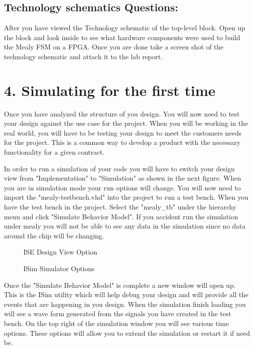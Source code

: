 \documentclass{article}
\begin{document}
\subsection{Technology schematics Questions:}
After you have viewed the Technology schematic of the top-level block. Open up the block and look inside to see what hardware components were used to build the Mealy FSM on a FPGA. Once you are done take a screen shot of the technology schematic and attach it to the lab report.

\section{4. Simulating for the first time}
Once you have analyzed the structure of you design. You will now need to test your design against the use case for the project. When you will be working in the real world, you will have to be testing your design to meet the customers needs for the project. This is a common way to develop a product with the necessary functionality for a given contract.

In order to run a simulation of your code you will have to switch your design view from "Implementation" to "Simulation" as shown in the next figure. When you are in simulation mode your run options will change. You will now need to import the "mealy-testbench.vhd" into the project to run a test bench. When you have the test bench in the project. Select the "mealy\_tb" under the hierarchy menu and click "Simulate Behavior Model". If you accident run the simulation under mealy you will not be able to see any data in the simulation since no data around the chip will be changing.

\begin{figure}[!htb]
  \centering
  \caption{ISE Design View Option}
\end{figure}

\begin{figure}[!htb]
  \centering
  \caption{ISim Simulator Options}
\end{figure}

Once the "Simulate Behavior Model" is complete a new window will open up. This is the ISim utility which will help debug your design and will provide all the events that are happening in you design. When the simulation finish loading you will see a wave form generated from the signals you have created in the test bench. On the top right of the simulation window you will see various time options. These options will allow you to extend the simulation or restart it if need be.
\end{document}

